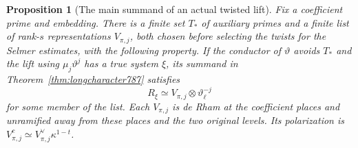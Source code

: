 \documentclass[a4paper,11pt]{article}
\newtheorem{proposition}{Proposition}[section]
\theoremstyle{definition}
\theoremstyle{remark}
\numberwithin{equation}{section}
\begin{document}
\begin{proposition}[The main summand of an actual twisted lift]
\leavevmode\label{prop:sourcetwist803}
Fix a coefficient prime and embedding. There is a finite set
\(T_*\) of auxiliary primes and a finite list of rank-\(s\)
representations \(V_{\pi,j}\), both chosen before selecting the
twists for the Selmer estimates, with the following property.
If the conductor of \(\vartheta\) avoids \(T_*\) and the lift
using \(\mu_j\vartheta^j\) has a true system
\(\xi\), its summand in Theorem~\ref{thm:longcharacter787} satisfies
\[
                  R_\xi\simeq V_{\pi,j}\otimes\vartheta_\ell^{-j}
\]
for some member of the list. Each \(V_{\pi,j}\) is de Rham at
the coefficient places and unramified away from these places and
the two original levels. Its polarization is
\(V_{\pi,j}^c\simeq V_{\pi,j}^{\vee}\kappa^{1-t}\).
\end{proposition}
\end{document}
